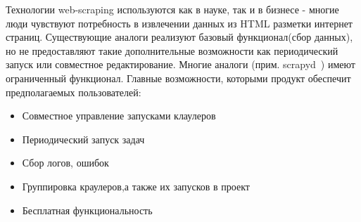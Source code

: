 Технологии web-scraping используются как в науке, так и в бизнесе - многие люди чувствуют потребность в извлечении данных из HTML разметки интернет страниц. Существующие аналоги реализуют базовый функционал(сбор данных), но не предоставляют такие дополнительные возможности как периодический запуск или совместное редактирование. Многие аналоги (прим. scrapyd~\cite{scrapyd}) имеют ограниченный функционал.
Главные возможности, которыми продукт обеспечит предполагаемых пользователей:
\begin{itemize}
    \item Совместное управление запусками клаулеров
    \item Периодический запуск задач
    \item Сбор логов, ошибок
    \item Группировка краулеров,а также их запусков в проект 
    \item Бесплатная функциональность
\end{itemize}

